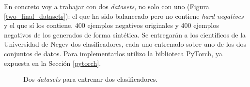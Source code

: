 En concreto voy a trabajar con dos \textit{datasets}, no solo con uno (Figura \ref{two_final_datasets}): el que ha sido balanceado pero no contiene \textit{hard negatives} y el que sí los contiene, 400 ejemplos negativos originales y 400 ejemplos negativos de los generados de forma sintética. Se entregarán a los científicos de la Universidad de Negev dos clasificadores, cada uno entrenado sobre uno de los dos conjuntos de datos. Para implementarlos utilizo la biblioteca PyTorch, ya expuesta en la Sección \ref{pytorch}.

\begin{figure}[H]
\centering
    \caption{Dos \textit{datasets} para entrenar dos clasificadores.} 
    \label{fig:two_final_datasets}
\end{figure}

